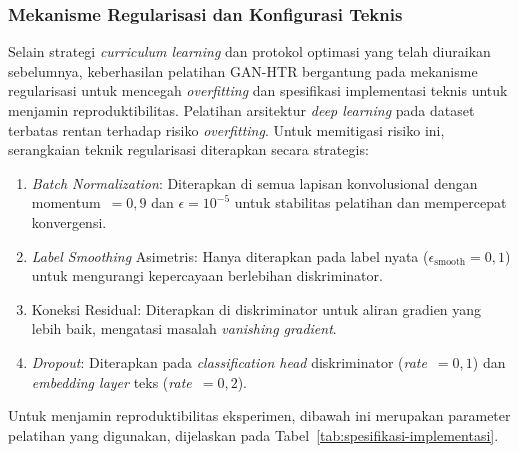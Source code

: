 \documentclass[12pt,a4paper]{article}
\begin{document}
\subsubsection{Mekanisme Regularisasi dan Konfigurasi Teknis}
\label{subsubsec:stabilitas-regularisasi}

Selain strategi \textit{curriculum learning} dan protokol optimasi yang telah diuraikan sebelumnya, keberhasilan pelatihan GAN-HTR bergantung pada mekanisme regularisasi untuk mencegah \textit{overfitting} dan spesifikasi implementasi teknis untuk menjamin reproduktibilitas. Pelatihan arsitektur \textit{deep learning} pada dataset terbatas rentan terhadap risiko \textit{overfitting}. Untuk memitigasi risiko ini, serangkaian teknik regularisasi diterapkan secara strategis:

\begin{enumerate}[label=\alph*., leftmargin=1.5em, labelsep=0.5em, itemindent=0pt, noitemsep, topsep=0pt]
  \item \textit{Batch Normalization}: Diterapkan di semua lapisan konvolusional dengan momentum~$=0,9$ dan $\epsilon=10^{-5}$ untuk stabilitas pelatihan dan mempercepat konvergensi.

  \item \textit{Label Smoothing} Asimetris: Hanya diterapkan pada label nyata ($\epsilon_{\text{smooth}}=0,1$) untuk mengurangi kepercayaan berlebihan diskriminator.

  \item Koneksi Residual: Diterapkan di diskriminator untuk aliran gradien yang lebih baik, mengatasi masalah \textit{vanishing gradient}.

  \item \textit{Dropout}: Diterapkan pada \textit{classification head} diskriminator (\textit{rate}~$=0,1$) dan \textit{embedding layer} teks (\textit{rate}~$=0,2$).
\end{enumerate}

Untuk menjamin reproduktibilitas eksperimen, dibawah ini merupakan parameter pelatihan yang digunakan, dijelaskan pada Tabel~\ref{tab:spesifikasi-implementasi}.
\end{document}

